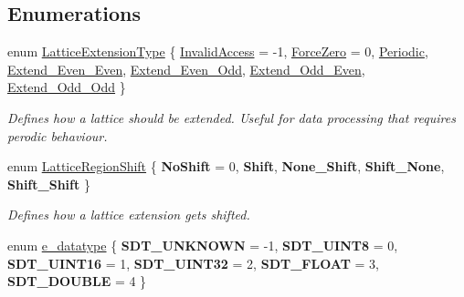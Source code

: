 \subsection*{Enumerations}
\begin{DoxyCompactItemize}
\item 
enum \hyperlink{namespacesisl_aaf1f41d23ed37dacaa4c9f1bb6d3324f}{Lattice\+Extension\+Type} \{ \newline
\hyperlink{namespacesisl_aaf1f41d23ed37dacaa4c9f1bb6d3324fadfcb36de23898505e7d6a7118c886659}{Invalid\+Access} = -\/1, 
\hyperlink{namespacesisl_aaf1f41d23ed37dacaa4c9f1bb6d3324fac0e9f82838a1a73b81d84d19571341a1}{Force\+Zero} = 0, 
\hyperlink{namespacesisl_aaf1f41d23ed37dacaa4c9f1bb6d3324fae2c9e90c80ef46b1a6b3b5c61dd8392e}{Periodic}, 
\hyperlink{namespacesisl_aaf1f41d23ed37dacaa4c9f1bb6d3324faa83636be87d2bc6798c54dbafe922e39}{Extend\+\_\+\+Even\+\_\+\+Even}, 
\newline
\hyperlink{namespacesisl_aaf1f41d23ed37dacaa4c9f1bb6d3324fa4557b0af0e76c30cf1ce9c7be615183c}{Extend\+\_\+\+Even\+\_\+\+Odd}, 
\hyperlink{namespacesisl_aaf1f41d23ed37dacaa4c9f1bb6d3324fa7f5a23d007bce2170e4aa405b7a0829e}{Extend\+\_\+\+Odd\+\_\+\+Even}, 
\hyperlink{namespacesisl_aaf1f41d23ed37dacaa4c9f1bb6d3324fa1ba3dc19cdffc9a67e046e50e1e64187}{Extend\+\_\+\+Odd\+\_\+\+Odd}
 \}\begin{DoxyCompactList}\small\item\em Defines how a lattice should be extended. Useful for data processing that requires perodic behaviour. \end{DoxyCompactList}
\item 
\mbox{\label{namespacesisl_af139f6f74488292ae48c0d71eaa5d4f1}} 
enum \hyperlink{namespacesisl_af139f6f74488292ae48c0d71eaa5d4f1}{Lattice\+Region\+Shift} \{ \newline
{\bfseries No\+Shift} = 0, 
{\bfseries Shift}, 
{\bfseries None\+\_\+\+Shift}, 
{\bfseries Shift\+\_\+\+None}, 
\newline
{\bfseries Shift\+\_\+\+Shift}
 \}\begin{DoxyCompactList}\small\item\em Defines how a lattice extension gets shifted. \end{DoxyCompactList}
\item 
enum \hyperlink{namespacesisl_acb05df69c6b8f6d31074a5f4cec4baeb}{e\+\_\+datatype} \{ \newline
{\bfseries S\+D\+T\+\_\+\+U\+N\+K\+N\+O\+WN} = -\/1, 
{\bfseries S\+D\+T\+\_\+\+U\+I\+N\+T8} = 0, 
{\bfseries S\+D\+T\+\_\+\+U\+I\+N\+T16} = 1, 
{\bfseries S\+D\+T\+\_\+\+U\+I\+N\+T32} = 2, 
\newline
{\bfseries S\+D\+T\+\_\+\+F\+L\+O\+AT} = 3, 
{\bfseries S\+D\+T\+\_\+\+D\+O\+U\+B\+LE} = 4
 \}
\end{DoxyCompactItemize}
